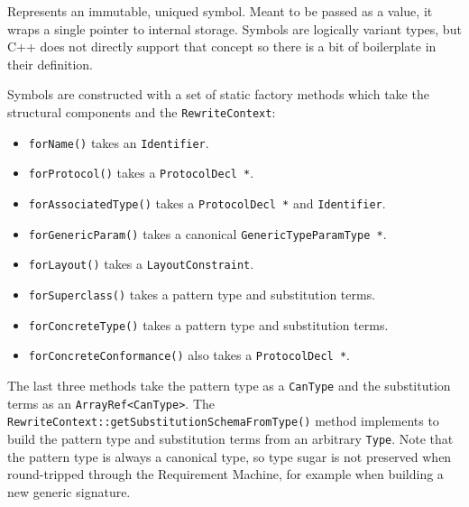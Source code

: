 \documentclass[../generics]{subfiles}
\begin{document}
Represents an immutable, uniqued symbol. Meant to be passed as a value, it wraps a single pointer to internal storage. Symbols are logically variant types, but C++ does not directly support that concept so there is a bit of boilerplate in their definition.

Symbols are constructed with a set of static factory methods which take the structural components and the \texttt{RewriteContext}:
\begin{itemize}
\item \texttt{forName()} takes an \texttt{Identifier}.
\item \texttt{forProtocol()} takes a \texttt{ProtocolDecl *}.
\item \texttt{forAssociatedType()} takes a \texttt{ProtocolDecl *} and \texttt{Identifier}.
\item \texttt{forGenericParam()} takes a canonical \texttt{GenericTypeParamType *}.
\item \texttt{forLayout()} takes a \texttt{LayoutConstraint}.
\item \texttt{forSuperclass()} takes a pattern type and substitution terms.
\item \texttt{forConcreteType()} takes a pattern type and substitution terms.
\item \texttt{forConcreteConformance()} also takes a \texttt{ProtocolDecl *}.
\end{itemize}
The last three methods take the pattern type as a \texttt{CanType} and the substitution terms as an \texttt{ArrayRef<CanType>}. The \texttt{RewriteContext::getSubstitutionSchemaFromType()} method implements  to build the pattern type and substitution terms from an arbitrary \texttt{Type}. Note that the pattern type is always a canonical type, so type sugar is not preserved when round-tripped through the Requirement Machine, for example when building a new generic signature.
\end{document}
